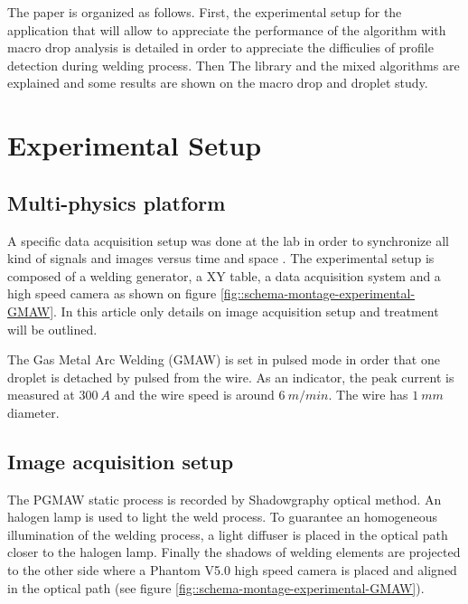 \documentclass[12pt]{iopart}
\begin{document}
The paper is organized as follows. First, the experimental setup for the application
 that will allow to appreciate the performance of the algorithm with
  macro drop analysis is detailed in order to appreciate the difficulies of profile detection
during welding process. 
Then The library and the mixed algorithms are explained and some results are shown on the macro drop and droplet study.


\section{Experimental Setup}
\label{experimental_setup}

\subsection{Multi-physics platform}
\label{multi_physics_platform}


A specific data acquisition setup was done at the lab in order to
synchronize all kind of signals and images versus time and space \cite{CHAPUIS2}.
The experimental setup is composed of a welding generator, a XY table, a data acquisition
system and a high speed camera as shown on figure \ref{fig::schema-montage-experimental-GMAW}.
In this article only details on image acquisition setup and treatment will be outlined.

The Gas Metal Arc Welding (GMAW) is set in pulsed mode in order that one droplet 
is detached by pulsed from the wire. As an indicator, the peak current is measured at $300\ A$ and the wire speed
is around $6\ m/min$. The wire has $1\ mm$ diameter.


\subsection{ Image acquisition setup}
\label{image_acquisition_setup}

The PGMAW static process is recorded by Shadowgraphy optical method. 
An halogen lamp is used to light the weld process. To guarantee an homogeneous
illumination of the welding process, a light diffuser is placed
in the optical path closer to the halogen lamp. 
Finally the shadows of welding elements are projected to the other side where
 a Phantom V5.0 high speed camera is placed and aligned in
 the optical path (see figure \ref{fig::schema-montage-experimental-GMAW}). 
\end{document}
